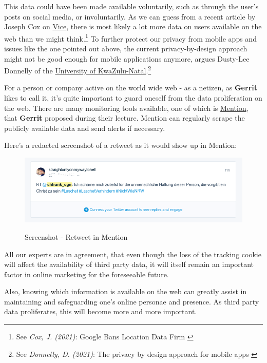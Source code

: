This data could have been made available voluntarily, such as through the user's posts on social media, or involuntarily. As we can guess from a recent article by Joseph Cox on \href{https://www.vice.com/en}{Vice}, there is most likely a lot more data on users available on the web than we might think.\footnote{See \textit{Cox, J. (2021)}: Google Bans Location Data Firm \cite{locationBan}} To further protect our privacy from mobile apps and issues like the one pointed out above, the current privacy-by-design approach might not be good enough for mobile applications anymore, argues Dusty-Lee Donnelly of the \href{https://ukzn.ac.za/}{University of KwaZulu-Natal}.\footnote{See \textit{Donnelly, D. (2021)}: The privacy by design approach for mobile apps \cite{privacyDesign}}

For a person or company active on the world wide web - as a netizen, as \textbf{Gerrit} likes to call it, it's quite important to guard oneself from the data proliferation on the web. There are many monitoring tools available, one of which is \href{https://mention.com/en/}{Mention}, that \textbf{Gerrit} proposed during their lecture. Mention can regularly scrape the publicly available data and send alerts if necessary. 

Here's a redacted screenshot of a retweet as it would show up in Mention:

\begin{figure}[H]
\centering
\caption {Screenshot - Retweet in Mention}
\includegraphics[width=\linewidth]{images/retweet-mention.png}
\label{fig:retweet}
\end{figure}

All our experts are in agreement, that even though the loss of the tracking cookie will affect the availability of third party data, it will itself remain an important factor in online marketing for the foreseeable future. 

Also, knowing which information is available on the web can greatly assist in maintaining and safeguarding one's online personae and presence. As third party data proliferates, this will become more and more important.

